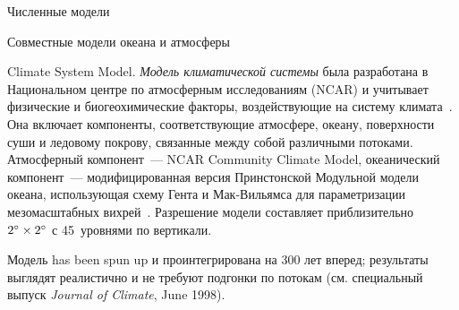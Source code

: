 \begin{chapter}{Численные модели}
\begin{section}{Совместные модели океана и атмосферы}
\begin{paragraph}{Climate System Model.}%
\emph{Модель климатической системы} была разработана в Национальном 
центре по атмосферным исследованиям (NCAR) и учитывает
физические и биогеохимические факторы, воздействующие на систему
климата~\cite{Boville:1998}. Она включает компоненты, соответствующие
атмосфере, океану, поверхности суши и ледовому покрову, связанные между
собой различными потоками. Атмосферный компонент~--- NCAR Community
Climate Model, океанический компонент~--- модифицированная версия
Принстонской Модульной модели океана, использующая схему Гента и Мак-Вильямса 
для параметризации мезомасштабных вихрей~\cite{Gent:1990}. 
Разрешение модели составляет
приблизительно~${2}^\circ\times{2}^\circ$ с 45~уровнями по
вертикали.
%

Модель has been spun up и проинтегрирована на 300 лет вперед; результаты 
выглядят реалистично и не требуют подгонки по потокам%
(см. специальный выпуск \textsl{Journal of Climate}, June 1998).
%
\end{paragraph}


\end{section}
\end{chapter}
